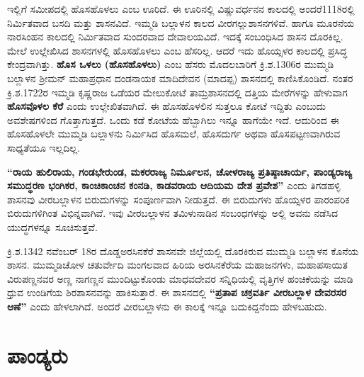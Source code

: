 ಇಲ್ಲಿಗೆ ಸಮೀಪದಲ್ಲಿ ಹೊಸಹೊಳಲು ಎಂಬ ಊರಿದೆ. ಈ ಊರಿನಲ್ಲಿ ವಿಷ್ಣುವರ್ಧನನ ಕಾಲದಲ್ಲಿ ಅಂದರೆ1118ರಲ್ಲಿ ನಿರ್ಮಿತವಾದ ಬಸದಿ ಮತ್ತು ಶಾಸನವಿದೆ. ಇಮ್ಮಡಿ ಬಲ್ಲಾಳನ ಕಾಲದ ವೀರಗಲ್ಲುಶಾಸನಗಳಿವೆ. ಹಾಗೂ ಮೂರನೆಯ ನಾರಸಿಂಹನ ಕಾಲದಲ್ಲಿ ನಿರ್ಮಿತವಾದ ಸುಂದರವಾದ ದೇವಾಲಯವಿದೆ. ಇದಕ್ಕೆ ಸಂಬಂಧಿಸಿದ ಶಾಸನ ದೊರಕಿಲ್ಲ. ಮೇಲೆ ಉಲ್ಲೇಖಿಸಿದ ಶಾಸನಗಳಲ್ಲಿ ಹೊಸಹೊಳಲು ಎಂಬ ಹೆಸರಿಲ್ಲ. ಆದರೆ ಇದು ಹೊಯ್ಸಳರ ಕಾಲದಲ್ಲಿ ಪ್ರಸಿದ್ಧ ಕೇಂದ್ರವಾಗಿತ್ತು. \textbf{ಹೊಸ ಒಳಲು (ಹೊಸಹೊಳಲು)} ಎಂಬ ಹೆಸರು ಮೊದಲಬಾರಿಗೆ ಕ್ರಿ.ಶ.1306ರ ಮುಮ್ಮಡಿ ಬಲ್ಲಾಳನ ಶ‍್ರೀಮನ್​ ಮಹಾಪ್ರಧಾನ ದಂಡನಾಯಕ ಮಾದಿದೇವನ (ಮಾದಪ್ಪ) ಶಾಸನದಲ್ಲಿ ಕಾಣಿಸಿಕೊಂಡಿದೆ. ನಂತರ ಕ್ರಿ.ಶ.1722ರ ಇಮ್ಮಡಿ ಕೃಷ್ಣರಾಜ ಒಡೆಯರ ಮೇಲುಕೋಟೆ ತಾಮ್ರಶಾಸನದಲ್ಲಿ ದತ್ತಿಯ ಮೇರೆಗಳನ್ನು ಹೇಳುವಾಗ \textbf{ಹೊಸವೊಳಲ ಕೆರೆ} ಎಂದು ಉಲ್ಲೇಖಿತವಾಗಿದೆ. ಈ ಹೊಸಹೊಳಲಿನ ಸುತ್ತಲೂ ಕೋಟೆ ಇದ್ದಿತು ಎಂಬುದು ಅವಶೇಷಗಳಿಂದ ಗೊತ್ತಾಗುತ್ತದೆ. ಒಂದು ಕಡೆ ಕೋಟೆಯ ಹೆಬ್ಬಾಗಿಲು ಇನ್ನೂ ಹಾಗೆಯೇ ಇದೆ. ಆದುರಿಂದ ಈ ಹೊಸಹೊಳಲೇ ಮುಮ್ಮಡಿ ಬಲ್ಲಾಳನು ನಿರ್ಮಿಸಿದ ಹೊಸಮಲೆ, ಹೊಸದುರ್ಗ ಅಥವಾ ಹೊಸಪಟ್ಟಣವಾಗಿರುವ ಸಾಧ್ಯತೆಯೂ ಇಲ್ಲದಿಲ್ಲ.

\textbf{“ರಾಯ ಹುಲಿರಾಯ, ಗಂಡಭೇರುಂಡ, ಮಕರರಾಜ್ಯ ನಿರ್ಮೂಲನ, ಚೋಳರಾಜ್ಯ ಪ್ರತಿಷ್ಠಾಚಾರ್ಯ,\general{\break } ಪಾಂಡ್ಯರಾಜ್ಯ ಸಮುದ್ಧರಣ ಭಂಗಿಕರ, ಕಾಂಚಿಕಾಂಚನ ಕಂನಡಿ, ಕಾಡವರಾಯ ಆದಿಯಮ ದೇಶ ಪ್ರವೇಶ”} ಎಂದು ತಿಗಡಹಳ್ಳಿ ಶಾಸನವು ವೀರಬಲ್ಲಾಳನ ಬಿರುದುಗಳನ್ನು ಸಂಪೂರ್ಣವಾಗಿ ನೀಡುತ್ತದೆ. ಈ ಬಿರುದುಗಳು ಹೊಯ್ಸಳರ ಪಾರಂಪರಿಕ ಬಿರುದು\-ಗಳಿಗಿಂತ ವಿಭಿನ್ನವಾಗಿವೆ. ಇವು ವೀರಬಲ್ಲಾಳನ ತಮಿಳುನಾಡಿನ ಸಂಬಂಧಗಳನ್ನು ಅಲ್ಲಿ ಅವನು ನಡೆಸಿದ ಯುದ್ಧಗಳನ್ನೂ ಸೂಚಿಸುತ್ತವೆ.

ಕ್ರಿ.ಶ.1342 ನವೆಂಬರ್​ 18ರ ದೊಡ್ಡಅರಸಿನಕೆರೆ ಶಾಸನವೇ ಜಿಲ್ಲೆಯಲ್ಲಿ ದೊರಕಿರುವ ಮುಮ್ಮಡಿ ಬಲ್ಲಾಳನ ಕೊನೆಯ ಶಾಸನ. ಮುಮ್ಮಡಿಚೋಳ ಚತುರ್ವೇದಿ ಮಂಗಲವಾದ ಹಿರಿಯ ಅರಸಿನಕೆರೆಯ ಮಹಾಜನಗಳು, ಮಹಾಪಸಾಯಿತ ವಿರುಪಣ್ಣನವರ ಅಣ್ಣ ನಾಗಣ್ಣನ ಮುಂದಿಟ್ಟುಕೊಂಡು ಮಾಧವದೇವರ ಸನ್ನಿಧಿಯಲ್ಲಿ ವೃತ್ತಿಗಳ ಹಂಚಿಕೆಯನ್ನು ಮಾಡಿ ಧ್ರುವ ಉಂಡಿಗೆಯ ಶಿರಶಾಸನವನ್ನು ಹಾಕಿಸುತ್ತಾರೆ. ಈ ಶಾಸನದಲ್ಲಿ \textbf{“ಪ್ರತಾಪ ಚಕ್ರವರ್ತಿ ವೀರಬಲ್ಲಾಳ ದೇವರಸರ ಆಣೆ”} ಎಂದು ಹೇಳಲಾಗಿದೆ. ಅಂದರೆ ವೀರಬಲ್ಲಾಳನು ಈ ಕಾಲಕ್ಕೆ ಇನ್ನೂ ಬದುಕಿದ್ದನೆಂದು ಹೇಳಬಹುದು.


\section*{ಪಾಂಡ್ಯರು}

